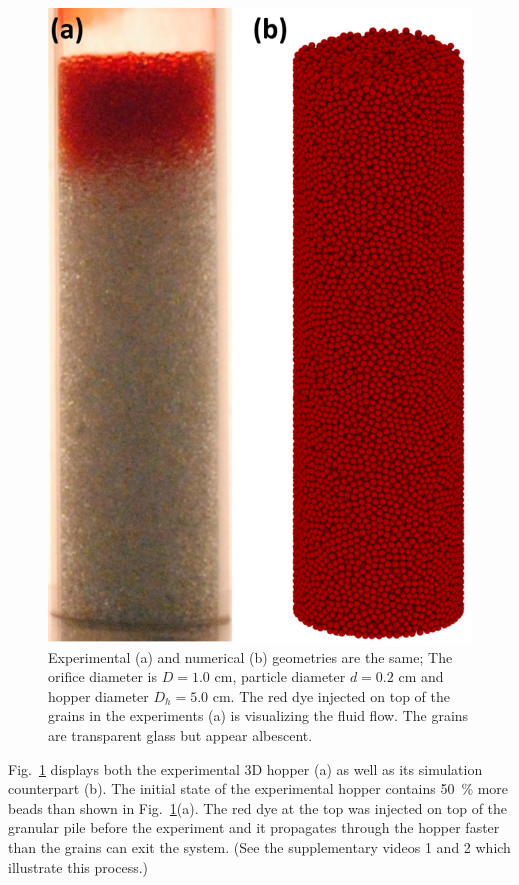 \documentclass[twoside,twocolumn,9pt]{article}
\begin{document}
\begin{figure}
\includegraphics[width=\columnwidth]{fig2-snapshot_exp_sim.png}
\caption{Experimental (a) and numerical (b) geometries are the same; The orifice diameter is $D=1.0$ cm, particle diameter $d=0.2$ cm and hopper diameter $D_h=5.0$ cm. The red dye injected on top of the grains in the experiments (a) is visualizing the fluid flow. The grains are transparent glass but appear albescent.
\label{fig:Geometry}}
\end{figure}
%
Fig.~\ref{fig:Geometry} displays both the experimental 3D hopper (a) as well as its simulation counterpart (b). The initial state of the experimental hopper contains 50~\% more beads than shown in Fig.~\ref{fig:Geometry}(a). The red dye at the top was injected on top of the granular pile before the experiment and it propagates through the hopper faster than the grains can exit the system. (See the supplementary videos 1 and 2 which illustrate this process.)
\end{document}
